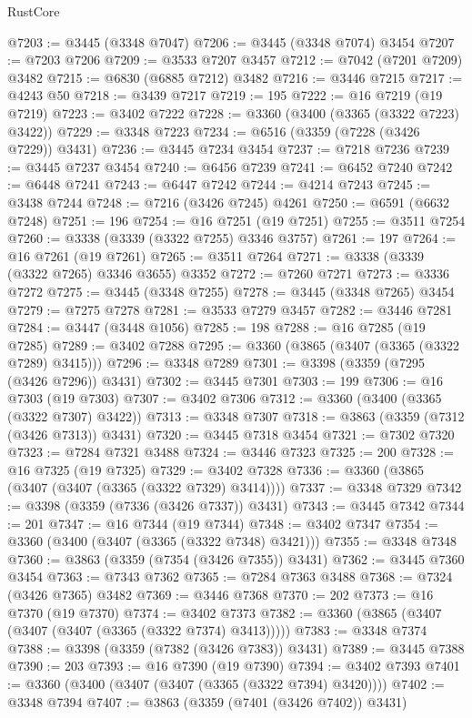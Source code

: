 \begin{lexlean}{RustCore}
\begin{coremodule}
@7203 := @3445 (@3348 @7047)
@7206 := @3445 (@3348 @7074) @3454
@7207 := @7203 @7206
@7209 := @3533 @7207 @3457
@7212 := @7042 (@7201 @7209) @3482
@7215 := @6830 (@6885 @7212) @3482
@7216 := @3446 @7215
@7217 := @4243 @50
@7218 := @3439 @7217
@7219 := 195
@7222 := @16 @7219 (@19 @7219)
@7223 := @3402 @7222
@7228 := @3360 (@3400 (@3365 (@3322 @7223) @3422))
@7229 := @3348 @7223
@7234 := @6516 (@3359 (@7228 (@3426 @7229)) @3431)
@7236 := @3445 @7234 @3454
@7237 := @7218 @7236
@7239 := @3445 @7237 @3454
@7240 := @6456 @7239
@7241 := @6452 @7240
@7242 := @6448 @7241
@7243 := @6447 @7242
@7244 := @4214 @7243
@7245 := @3438 @7244
@7248 := @7216 (@3426 @7245) @4261
@7250 := @6591 (@6632 @7248)
@7251 := 196
@7254 := @16 @7251 (@19 @7251)
@7255 := @3511 @7254
@7260 := @3338 (@3339 (@3322 @7255) @3346 @3757)
@7261 := 197
@7264 := @16 @7261 (@19 @7261)
@7265 := @3511 @7264
@7271 := @3338 (@3339 (@3322 @7265) @3346 @3655) @3352
@7272 := @7260 @7271
@7273 := @3336 @7272
@7275 := @3445 (@3348 @7255)
@7278 := @3445 (@3348 @7265) @3454
@7279 := @7275 @7278
@7281 := @3533 @7279 @3457
@7282 := @3446 @7281
@7284 := @3447 (@3448 @1056)
@7285 := 198
@7288 := @16 @7285 (@19 @7285)
@7289 := @3402 @7288
@7295 := @3360 (@3865 (@3407 (@3365 (@3322 @7289) @3415)))
@7296 := @3348 @7289
@7301 := @3398 (@3359 (@7295 (@3426 @7296)) @3431)
@7302 := @3445 @7301
@7303 := 199
@7306 := @16 @7303 (@19 @7303)
@7307 := @3402 @7306
@7312 := @3360 (@3400 (@3365 (@3322 @7307) @3422))
@7313 := @3348 @7307
@7318 := @3863 (@3359 (@7312 (@3426 @7313)) @3431)
@7320 := @3445 @7318 @3454
@7321 := @7302 @7320
@7323 := @7284 @7321 @3488
@7324 := @3446 @7323
@7325 := 200
@7328 := @16 @7325 (@19 @7325)
@7329 := @3402 @7328
@7336 := @3360 (@3865 (@3407 (@3407 (@3365 (@3322 @7329) @3414))))
@7337 := @3348 @7329
@7342 := @3398 (@3359 (@7336 (@3426 @7337)) @3431)
@7343 := @3445 @7342
@7344 := 201
@7347 := @16 @7344 (@19 @7344)
@7348 := @3402 @7347
@7354 := @3360 (@3400 (@3407 (@3365 (@3322 @7348) @3421)))
@7355 := @3348 @7348
@7360 := @3863 (@3359 (@7354 (@3426 @7355)) @3431)
@7362 := @3445 @7360 @3454
@7363 := @7343 @7362
@7365 := @7284 @7363 @3488
@7368 := @7324 (@3426 @7365) @3482
@7369 := @3446 @7368
@7370 := 202
@7373 := @16 @7370 (@19 @7370)
@7374 := @3402 @7373
@7382 := @3360 (@3865 (@3407 (@3407 (@3407 (@3365 (@3322 @7374) @3413)))))
@7383 := @3348 @7374
@7388 := @3398 (@3359 (@7382 (@3426 @7383)) @3431)
@7389 := @3445 @7388
@7390 := 203
@7393 := @16 @7390 (@19 @7390)
@7394 := @3402 @7393
@7401 := @3360 (@3400 (@3407 (@3407 (@3365 (@3322 @7394) @3420))))
@7402 := @3348 @7394
@7407 := @3863 (@3359 (@7401 (@3426 @7402)) @3431)

\end{coremodule}
\end{lexlean}
